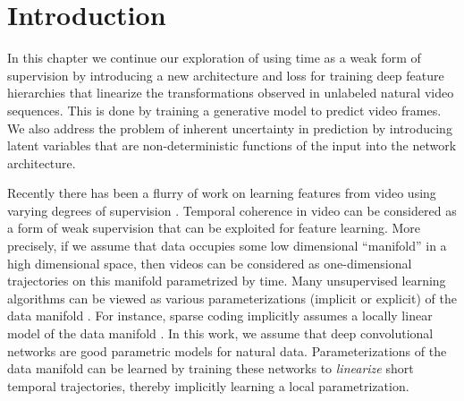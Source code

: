
\section{Introduction}
In this chapter we continue our exploration of using time as a weak form of
supervision by introducing a new architecture and loss for training deep
feature hierarchies that linearize the transformations observed in unlabeled
natural video sequences. This is done by training a generative model to predict
video frames. We also address the problem of inherent uncertainty in prediction
by introducing latent variables that are non-deterministic functions of the
input into the network architecture. 


Recently there has been a flurry of work on learning features from video using
varying degrees of supervision
\cite{supFromTracker}\cite{FBvideo}\cite{predAlexNet}. Temporal coherence in
video can be considered as a form of weak supervision that can be exploited for
feature learning. More precisely, if we assume that data occupies some low
dimensional ``manifold'' in a high dimensional space, then videos can be
considered as one-dimensional trajectories on this manifold parametrized by
time. Many unsupervised learning algorithms can be viewed as various
parameterizations (implicit or explicit) of the data manifold
\cite{Bengio2012}. For instance, sparse coding implicitly assumes a locally
linear model of the data manifold \cite{sparseCoding}. In this work, we assume
that deep convolutional networks are good parametric models for natural data.
Parameterizations of the data manifold can be learned by training these
networks to \emph{linearize} short temporal trajectories, thereby implicitly
learning a local parametrization.   

